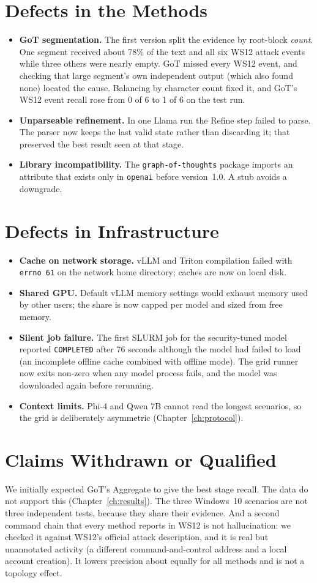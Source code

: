 \section{Defects in the Methods}
\begin{itemize}
\item \textbf{GoT segmentation.} The first version split the evidence by root-block \emph{count}. One segment received about 78\% of the text and all six WS12 attack events while three others were nearly empty. GoT missed every WS12 event, and checking that large segment's own independent output (which also found none) located the cause. Balancing by character count fixed it, and GoT's WS12 event recall rose from 0 of 6 to 1 of 6 on the test run.
\item \textbf{Unparseable refinement.} In one Llama run the Refine step failed to parse. The parser now keeps the last valid state rather than discarding it; that preserved the best result seen at that stage.
\item \textbf{Library incompatibility.} The \texttt{graph-of-thoughts} package imports an attribute that exists only in \texttt{openai} before version~1.0. A stub avoids a downgrade.
\end{itemize}

\section{Defects in Infrastructure}
\begin{itemize}
\item \textbf{Cache on network storage.} vLLM and Triton compilation failed with \texttt{errno 61} on the network home directory; caches are now on local disk.
\item \textbf{Shared GPU.} Default vLLM memory settings would exhaust memory used by other users; the share is now capped per model and sized from free memory.
\item \textbf{Silent job failure.} The first SLURM job for the security-tuned model reported \texttt{COMPLETED} after 76 seconds although the model had failed to load (an incomplete offline cache combined with offline mode). The grid runner now exits non-zero when any model process fails, and the model was downloaded again before rerunning.
\item \textbf{Context limits.} Phi-4 and Qwen 7B cannot read the longest scenarios, so the grid is deliberately asymmetric (Chapter~\ref{ch:protocol}).
\end{itemize}

\section{Claims Withdrawn or Qualified}
We initially expected GoT's Aggregate to give the best stage recall. The data do not support this (Chapter~\ref{ch:results}). The three Windows~10 scenarios are not three independent tests, because they share their evidence. And a second command chain that every method reports in WS12 is not hallucination: we checked it against WS12's official attack description, and it is real but unannotated activity (a different command-and-control address and a local account creation). It lowers precision about equally for all methods and is not a topology effect.
